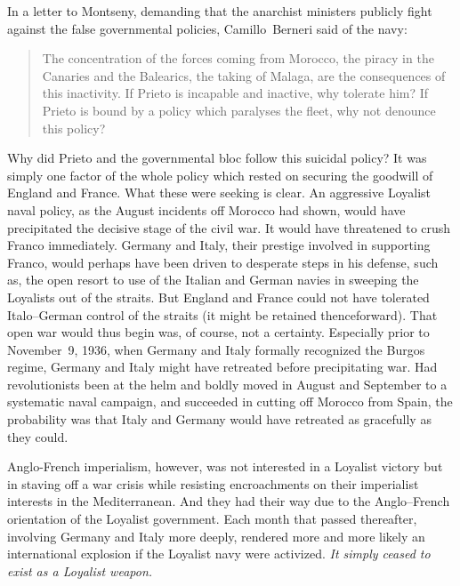 In a letter to Montseny, demanding that the anarchist ministers publicly fight against the false governmental policies, Camillo~Ber\-neri said of the navy:

\indexIPrieto{}
\begin{quotation}
  The concentration of the forces coming from Morocco, the piracy in the Canaries and the Balearics, the taking of Malaga, are the consequences of this inactivity. If Prieto is incapable and inactive, why tolerate him? If Prieto is bound by a policy which paralyses the fleet, why not denounce this policy?
\end{quotation}

Why did Prieto and the governmental bloc follow this suicidal policy? It was simply one factor of the whole policy which rested on securing the goodwill of England and France. What these were seeking is clear. An aggressive Loyalist naval policy, as the August incidents off Morocco had shown, would have precipitated the decisive stage of the civil war. It would have threatened to crush Franco immediately. Germany and Italy, their prestige involved in supporting Franco, would perhaps have been driven to desperate steps in his defense, such as, the open resort to use of the Italian and German navies in sweeping the Loyalists out of the straits. But England and France could not have tolerated Italo--German control of the straits (it might be retained thenceforward). That open war would thus begin was, of course, not a certainty. Especially prior to November~9, 1936, when Germany and Italy formally recognized the Burgos regime, Germany and Italy might have retreated before precipitating war. Had revolutionists been at the helm and boldly moved in August and September to a systematic naval campaign, and succeeded in cutting off Morocco from Spain, the probability was that Italy and Germany would have retreated as gracefully as they could.

Anglo-French imperialism, however, was not interested in a Loyalist victory but in staving off a war crisis while resisting encroachments on their imperialist interests in the Mediterranean. And they had their way due to the Anglo--French orientation of the Loyalist government. Each month that passed thereafter, involving Germany and Italy more deeply, rendered more and more likely an international explosion if the Loyalist navy were activized. \emph{It simply ceased to exist as a Loyalist weapon.}

